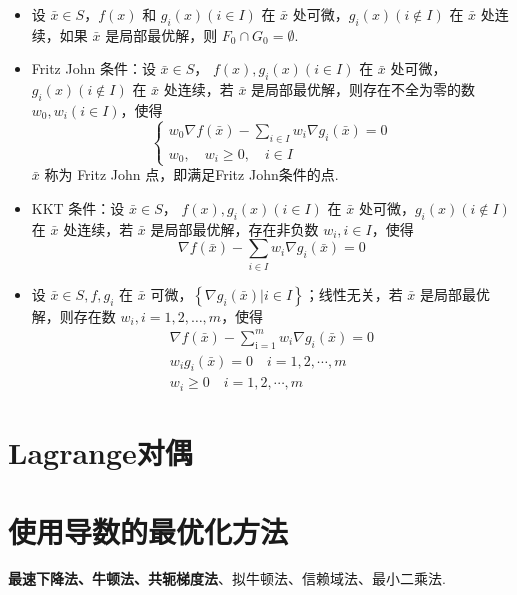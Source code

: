 \begin{remark}
\begin{itemize}
\begin{itemize}
            \item 设 $\bar{x} \in S$，$f(x)$ 和 $g_i(x)(i \in I)$ 在 $\bar{x}$ 处可微，$g_i(x)(i \notin I)$ 在 $\bar{x}$ 处连续，如果 $\bar{x}$ 是局部最优解，则 $F_0\cap G_0 = \emptyset$.
            \item Fritz John 条件：设 $\bar{x} \in S$， $f(x), g_i(x)(i \in I)$ 在 $\bar{x}$ 处可微，$g_i(x)(i\notin I)$ 在 $\bar{x}$ 处连续，若 $\bar{x}$ 是局部最优解，则存在不全为零的数 $w_0, w_i(i \in I)$，使得 \[\begin{cases}
                w_{0} \nabla f(\bar{x})-\sum_{i \in I} w_{i} \nabla g_{i}(\bar{x})=0 \\
                w_{0}, \quad w_{i} \geq 0, \quad i \in I
            \end{cases}\] $\bar{x}$ 称为 Fritz John 点，即满足Fritz John条件的点.
            \item KKT 条件：设 $\bar{x} \in S$， $f(x), g_i(x)(i \in I)$ 在 $\bar{x}$ 处可微，$g_i(x)(i\notin I)$ 在 $\bar{x}$ 处连续，若 $\bar{x}$ 是局部最优解，存在非负数 $w_i, i \in I$，使得\[\nabla f(\bar{x}) - \sum_{i \in I}w_i\nabla g_i(\bar{x}) = 0\]
            \item 设 $\bar{x} \in S, f, g_i$ 在 $\bar{x}$ 可微，$\left\{\nabla g_i(\bar{x}) | i \in I\right\}$；线性无关，若 $\bar{x}$ 是局部最优解，则存在数 $w_i, i=1, 2, \dots, m$，使得\[\begin{array}{l}
                \nabla f(\bar{x})-\sum_{\mathrm{i}=1}^{m} w_{i} \nabla g_{i}(\bar{x})=0 \\
                w_{i} g_{i}(\bar{x})=0 \quad i=1,2, \cdots, m \\
                w_{i} \geq 0 \quad i=1,2, \cdots, m 
            \end{array}\]
        \end{itemize}
    \end{itemize}
\end{remark}

\section{Lagrange对偶}

\section{使用导数的最优化方法}
\textbf{最速下降法、牛顿法、共轭梯度法}、拟牛顿法、信赖域法、最小二乘法.

